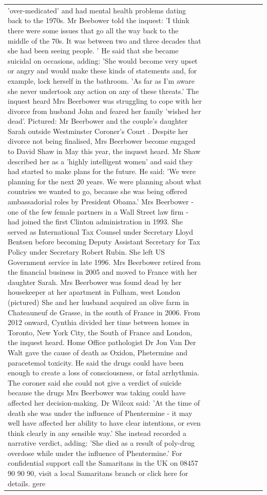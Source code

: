 \begin{table}[H]
\begin{tabular}{lllrlllll}
'over-medicated' and had mental health problems dating back to the 1970s. Mr Beebower told the inquest: 'I think there were some issues that go all the way back to the middle of the 70s. It was between two and three decades that she had been seeing people. ' He said that she became suicidal on occasions, adding: 'She would become very upset or angry and would make these kinds of statements and, for example, lock herself in the bathroom. 'As far as I'm aware she never undertook any action on any of these threats.' The inquest heard Mrs Beerbower was struggling to cope with her divorce from husband John and feared her family 'wished her dead'. Pictured: Mr Beerbower and the couple's daughter Sarah outside Westminster Coroner's Court . Despite her divorce not being finalised, Mrs Beerbower become engaged to David Shaw in May this year, the inquest heard. Mr Shaw described her as a 'highly intelligent women' and said they had started to make plans for the future. He said: 'We were planning for the next 20 years. We were planning about what countries we wanted to go, because she was being offered ambassadorial roles by President Obama.' Mrs Beerbower - one of the few female partners in a Wall Street law firm - had joined the first Clinton administration in 1993. She served as International Tax Counsel under Secretary Lloyd Bentsen before becoming Deputy Assistant Secretary for Tax Policy under Secretary Robert Rubin. She left US Government service in late 1996. Mrs Beerbower retired from the financial business in 2005 and moved to France with her daughter Sarah. Mrs Beerbower was found dead by her housekeeper at her apartment in Fulham, west London (pictured) She and her husband acquired an olive farm in Chateauneuf de Grasse, in the south of France in 2006. From 2012 onward, Cynthia divided her time between homes in Toronto, New York City, the South of France and London, the inquest heard. Home Office pathologist Dr Jon Van Der Walt gave the cause of death as Oxidon, Phetermine and paracetemol toxicity. He said the drugs could have been enough to create a loss of consciousness, or fatal arrhythmia. The coroner said she could not give a verdict of suicide because the drugs Mrs Beerbower was taking could have affected her decision-making. Dr Wilcox said: 'At the time of death she was under the influence of Phentermine - it may well have affected her ability to have clear intentions, or even think clearly in any sensible way.' She instead recorded a narrative verdict, adding: 'She died as a result of poly-drug overdose while under the influence of Phentermine.' For confidential support call the Samaritans in the UK on 08457 90 90 90, visit a local Samaritans branch or click here for details. gere \\

\end{tabular}
\end{table}
